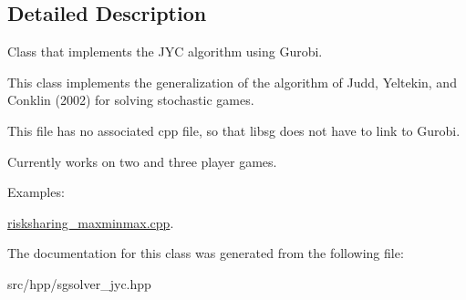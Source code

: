 \subsection{Detailed Description}
Class that implements the J\+YC algorithm using Gurobi. 

This class implements the generalization of the algorithm of Judd, Yeltekin, and Conklin (2002) for solving stochastic games.

This file has no associated cpp file, so that libsg does not have to link to Gurobi.

Currently works on two and three player games. \begin{Desc}
\item[Examples\+: ]\par
\hyperlink{risksharing_maxminmax_8cpp-example}{risksharing\+\_\+maxminmax.\+cpp}.\end{Desc}


The documentation for this class was generated from the following file\+:\begin{DoxyCompactItemize}
\item 
src/hpp/sgsolver\+\_\+jyc.\+hpp\end{DoxyCompactItemize}
